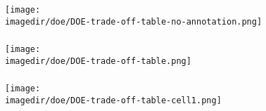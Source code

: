 %
%
%
%
%
%
%
%
%

\begin{frame}\frametitle{}
	\begin{center}
	\texttt{[image: \\imagedir/doe/DOE-trade-off-table-no-annotation.png]}
	\end{center}
\end{frame}

\begin{frame}\frametitle{}
	\begin{center}
	\texttt{[image: \\imagedir/doe/DOE-trade-off-table.png]}
	\end{center}
\end{frame}

\begin{frame}\frametitle{}
	\begin{center}
	\texttt{[image: \\imagedir/doe/DOE-trade-off-table-cell1.png]}
	\end{center}
\end{frame}

